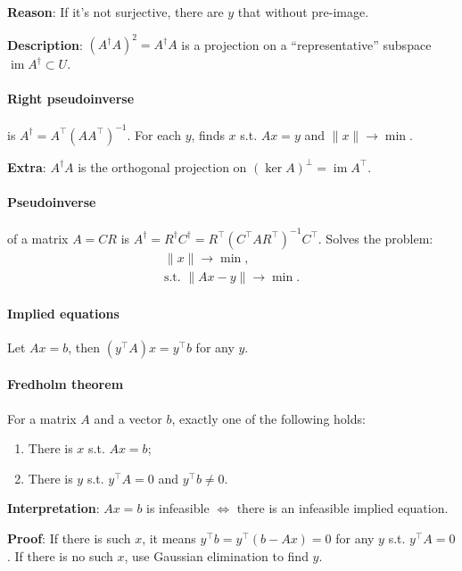 \documentclass{article}
\begin{document}
\textbf{Reason}: If it's not surjective, there are $y$ that without pre-image.

\textbf{Description}: $(A^\dagger A)^2 = A^\dagger A$ is a projection on a ``representative'' subspace $\operatorname{im} A^\dagger \subset U$.

\paragraph{Right pseudoinverse} is $A^\dagger = A^\top (A A^\top)^{-1}$. For each $y$, finds $x$ s.t. $Ax = y$ and $\|x\| \to \min$.

\textbf{Extra}: $A^\dagger A$ is the orthogonal projection on $(\ker A)^\perp = \operatorname{im}A^\top$.

\paragraph{Pseudoinverse} of a matrix $A = CR$ is $A^\dagger =  R^\dagger C^\dagger = R^\top (C^\top A R^\top)^{-1} C^\top$. Solves the problem:
\begin{gather*}
\|x\| \to \min, \\
\text{s.t. } \|Ax-y\| \to \min.
\end{gather*}

\paragraph{Implied equations} Let $Ax = b$, then $(y^\top A)x = y^\top b$ for any $y$.

\paragraph{Fredholm theorem} For a matrix $A$ and a vector $b$, exactly one of the following holds:

\begin{enumerate}
    \item There is $x$ s.t. $Ax = b$;
    \item There is $y$ s.t. $y^\top A = 0$ and $y^\top b \neq 0$.
\end{enumerate}

\textbf{Interpretation}: $Ax = b$ is infeasible $\iff$ there is an infeasible implied equation.

\textbf{Proof}: If there is such $x$, it means $y^\top b = y^\top (b-Ax) = 0$ for any $y$ s.t. $y^\top A = 0$. If there is no such $x$, use Gaussian elimination to find $y$.
\end{document}

